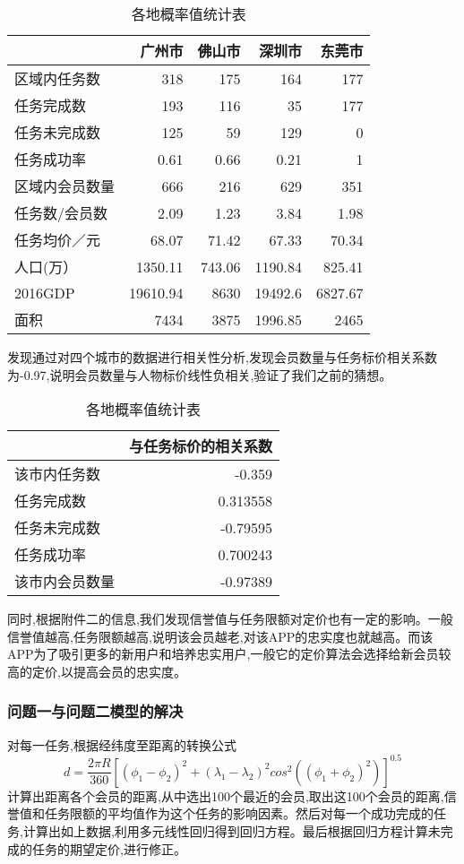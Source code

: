 \documentclass{cumcmthesis}
\begin{document}
\begin{table}[!htbp]
	\caption{各地概率值统计表}\label{tab001} \centering
	\begin{tabular}{lrrrr}
		\toprule[1.5pt]
		$ $    & {广州市} & {佛山市} & {深圳市} & {东莞市} \\
		\midrule[1pt]
		区域内任务数 & 318   & 175   & 164   & 177 \\
		任务完成数 & 193   & 116   & 35    & 177 \\
		任务未完成数 & 125   & 59    & 129   & 0 \\
		任务成功率 & 0.61  & 0.66  & 0.21  & 1 \\
		区域内会员数量 & 666   & 216   & 629   & 351 \\
		任务数/会员数 & 2.09  & 1.23  & 3.84  & 1.98 \\
		任务均价／元 & 68.07 & 71.42 & 67.33 & 70.34 \\
		人口(万） & 1350.11 & 743.06 & 1190.84 & 825.41 \\
		2016GDP & 19610.94 & 8630  & 19492.6 & 6827.67 \\
		面积    & 7434  & 3875  & 1996.85 & 2465 \\
		\bottomrule[1.5pt]
	\end{tabular}%
\end{table}
发现通过对四个城市的数据进行相关性分析,发现会员数量与任务标价相关系数为-0.97,说明会员数量与人物标价线性负相关,验证了我们之前的猜想。

\begin{table}[!htbp]
	\caption{各地概率值统计表}\label{tab001} \centering
	\begin{tabular}{lr}
		\toprule[1.5pt]
		& {与任务标价的相关系数} \\
		\midrule[1pt]
		该市内任务数 & -0.359 \\
		任务完成数 & 0.313558 \\
		任务未完成数 & -0.79595 \\
		任务成功率 & 0.700243 \\
		该市内会员数量 & -0.97389 \\
		\bottomrule[1.5pt]
	\end{tabular}%
\end{table}

同时,根据附件二的信息,我们发现信誉值与任务限额对定价也有一定的影响。一般信誉值越高,任务限额越高,说明该会员越老,对该APP的忠实度也就越高。而该APP为了吸引更多的新用户和培养忠实用户,一般它的定价算法会选择给新会员较高的定价,以提高会员的忠实度。


\subsubsection{问题一与问题二模型的解决}
对每一任务,根据经纬度至距离的转换公式
\begin{equation}
\left.
d=\frac{2\pi R}{360}\left[ \left(\phi_1-\phi_2\right)^2+  \left(\lambda_1-\lambda_2\right)^2cos^2\left(\left(\phi_1+\phi_2\right)^2\right)  \right]^{0.5}
\right.
\end{equation}
计算出距离各个会员的距离,从中选出100个最近的会员,取出这100个会员的距离,信誉值和任务限额的平均值作为这个任务的影响因素。然后对每一个成功完成的任务,计算出如上数据,利用多元线性回归得到回归方程。最后根据回归方程计算未完成的任务的期望定价,进行修正。
\end{document}
